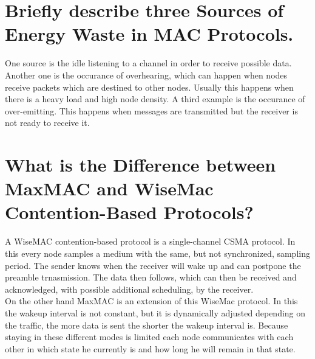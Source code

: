 \documentclass{report}
\begin{document}
	\section{Briefly describe three Sources of Energy Waste in MAC Protocols.}
	\startsection
		One source is the idle listening to a channel in order to receive possible data. Another one is the occurance of overhearing, which can happen when nodes receive packets which are destined to other nodes. Usually this happens when there is a heavy load and high node density. A third example is the occurance of over-emitting. This happens when messages are transmitted but the receiver is not ready to receive it.
	\closesection
	
	\section{What is the Difference between MaxMAC and WiseMac Contention-Based Protocols?}
	\startsection
		A WiseMAC contention-based protocol is a single-channel CSMA protocol. In this every node samples a medium with the same, but not synchronized, sampling period. The sender knows when the receiver will wake up and can postpone the preamble trnasmission. The data then follows, which can then be received and acknowledged, with possible additional scheduling, by the receiver. \\
		On the other hand MaxMAC is an extension of this WiseMac protocol. In this the wakeup interval is not constant, but it is dynamically adjusted depending on the traffic, the more data is sent the shorter the wakeup interval is. Because staying in these different modes is limited each node communicates with each other in which state he currently is and how long he will remain in that state.
	\closesection
	
\end{document}
